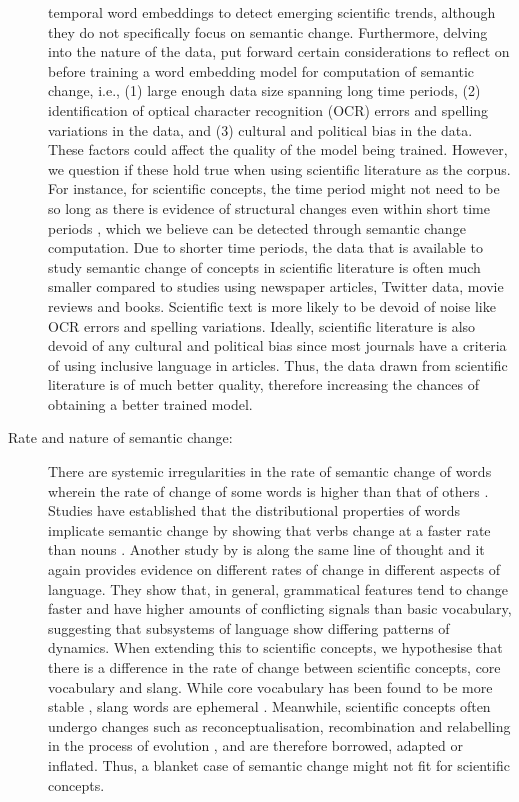 \documentclass[output=paper]{langsci/langscibook}
\begin{document}
\begin{description}
temporal word embeddings to detect emerging scientific trends, although they do not specifically focus on semantic change. Furthermore, delving into the nature of the data, \citet{MelvinWeversandMarijnKoolenKoolen2020} put forward certain considerations to reflect on before training a word embedding model for computation of semantic change, i.e., (1) large enough data size spanning long time periods, (2) identification of optical character recognition (OCR) errors and spelling variations in the data, and (3) cultural and political bias in the data. These factors could affect the quality of the model being trained. However, we question if these hold true when using scientific literature as the corpus. For instance, for scientific concepts, the time period might not need to be so long as there is evidence of structural changes even within short time periods \citep{mahanty2019studying}, which we believe can be detected through semantic change computation. Due to shorter time periods, the data that is available to study semantic change of concepts in scientific literature is often much smaller compared to studies using newspaper articles, Twitter data, movie reviews and books. Scientific text is more likely to be devoid of noise like OCR errors and spelling variations. Ideally, scientific literature is also devoid of any cultural and political bias since most journals have a criteria of using inclusive language in articles. Thus, the data drawn from scientific literature is of much better quality, therefore increasing the chances of obtaining a better trained model.

\item[Rate and nature of semantic change:] There are systemic irregularities in the rate of semantic change of words wherein the rate of change of some words is higher than that of others \citep{hamilton-etal-2016-diachronic}. Studies have established that the distributional properties of words implicate semantic change by showing that verbs change at a faster rate than nouns \citep{dubossarsky2016verbs}. Another study by \citet{greenhill2017evolutionary} is along the same line of thought and it again provides evidence on different rates of change in different aspects of language. They show that, in general, grammatical features tend to change faster and have higher amounts of conflicting signals than basic vocabulary, suggesting that subsystems of language show differing patterns of dynamics. When extending this to scientific concepts, we hypothesise that there is a difference in the rate of change between scientific concepts, core vocabulary and slang. While core vocabulary has been found to be more stable \citep{bengtson2011basque}, slang words are ephemeral \citep{wang2020analysis}. Meanwhile, scientific concepts often undergo changes such as reconceptualisation, recombination and relabelling in the process of evolution \citep{bradie1986assessing}, and are therefore borrowed, adapted or inflated. Thus, a blanket case of semantic change might not fit for scientific concepts.
\end{description}
\end{document}
